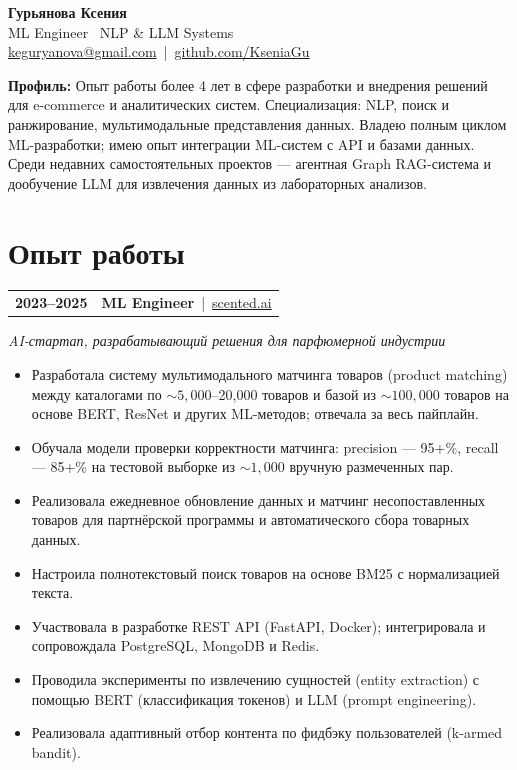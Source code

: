 \documentclass[12pt]{article}
\begin{document}
\begin{center}
    {\Large \textbf{Гурьянова Ксения}}\\[4pt]
    {\large ML Engineer \textbar\ NLP \& LLM Systems}\\[5pt]
    \href{mailto:keguryanova@gmail.com}{\textcolor{blue!65!black}{keguryanova@gmail.com}} \,|\,
    \href{https://github.com/KseniaGu}{\textcolor{blue!65!black}{github.com/KseniaGu}}
\end{center}

\vspace{4pt}

\noindent\textbf{Профиль:} Опыт работы более 4 лет в сфере разработки и внедрения решений для e-commerce и аналитических систем. Специализация: NLP, поиск и ранжирование, мультимодальные представления данных. Владею полным циклом ML-разработки; имею опыт интеграции ML-систем с API и базами данных. Среди недавних самостоятельных проектов — агентная Graph RAG-система и дообучение LLM для извлечения данных из лабораторных анализов.

\section*{Опыт работы}
\vspace{3pt}

\begin{tabularx}{\textwidth}{@{}l >{\RaggedRight\arraybackslash}X@{}}
\textbf{2023--2025} & \textbf{ML Engineer} \,|\, \href{https://scented.ai/}{scented.ai}
\end{tabularx}
\vspace{2pt}
\textit{AI-стартап, разрабатывающий решения для парфюмерной индустрии}
\begin{itemize}
  \item Разработала систему мультимодального матчинга товаров (product matching) между каталогами по \(\sim\!5{,}000\)–20,000 товаров и базой из \(\sim\!100{,}000\) товаров на основе BERT, ResNet и других ML-методов; отвечала за весь пайплайн.
  \item Обучала модели проверки корректности матчинга: precision — 95+\%, recall — 85+\% на тестовой выборке из \(\sim\!1{,}000\) вручную размеченных пар.
  \item Реализовала ежедневное обновление данных и матчинг несопоставленных товаров для партнёрской программы и автоматического сбора товарных данных.
  \item Настроила полнотекстовый поиск товаров на основе BM25 с нормализацией текста.
  \item Участвовала в разработке REST API (FastAPI, Docker); интегрировала и сопровождала PostgreSQL, MongoDB и Redis.
  \item Проводила эксперименты по извлечению сущностей (entity extraction) с помощью BERT (классификация токенов) и LLM (prompt engineering).
  \item Реализовала адаптивный отбор контента по фидбэку пользователей (k-armed bandit).
\end{itemize}
\vspace{2pt}
\end{document}
